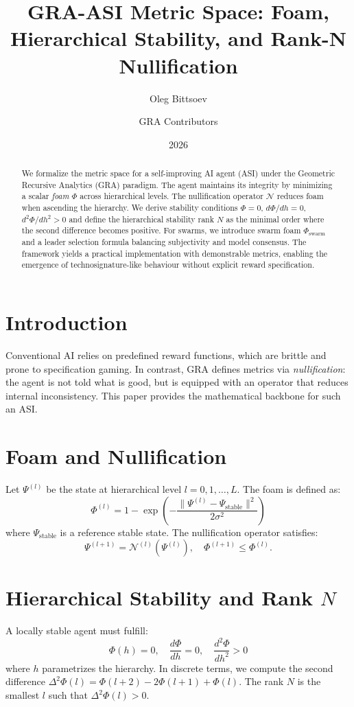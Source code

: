 \documentclass{article}
\title{GRA-ASI Metric Space: Foam, Hierarchical Stability, and Rank-N Nullification}
\author{Oleg Bittsoev \and GRA Contributors}
\date{2026}
\begin{document}
\maketitle

\begin{abstract}
We formalize the metric space for a self-improving AI agent (ASI) under the Geometric Recursive Analytics (GRA) paradigm. The agent maintains its integrity by minimizing a scalar \textit{foam} $\Phi$ across hierarchical levels. The nullification operator $\mathcal{N}$ reduces foam when ascending the hierarchy. We derive stability conditions $\Phi=0$, $d\Phi/dh=0$, $d^2\Phi/dh^2>0$ and define the hierarchical stability rank $N$ as the minimal order where the second difference becomes positive. For swarms, we introduce swarm foam $\Phi_{\text{swarm}}$ and a leader selection formula balancing subjectivity and model consensus. The framework yields a practical implementation with demonstrable metrics, enabling the emergence of technosignature-like behaviour without explicit reward specification.
\end{abstract}

\section{Introduction}
Conventional AI relies on predefined reward functions, which are brittle and prone to specification gaming. In contrast, GRA defines metrics via \textit{nullification}: the agent is not told what is good, but is equipped with an operator that reduces internal inconsistency. This paper provides the mathematical backbone for such an ASI.

\section{Foam and Nullification}
Let $\Psi^{(l)}$ be the state at hierarchical level $l=0,1,\dots,L$. The foam is defined as:
\[
\Phi^{(l)} = 1 - \exp\left(-\frac{\|\Psi^{(l)} - \Psi_{\text{stable}}\|^2}{2\sigma^2}\right)
\]
where $\Psi_{\text{stable}}$ is a reference stable state. The nullification operator satisfies:
\[
\Psi^{(l+1)} = \mathcal{N}^{(l)}(\Psi^{(l)}),\quad \Phi^{(l+1)} \le \Phi^{(l)}.
\]

\section{Hierarchical Stability and Rank $N$}
A locally stable agent must fulfill:
\[
\Phi(h) = 0,\quad \frac{d\Phi}{dh}=0,\quad \frac{d^2\Phi}{dh^2} > 0
\]
where $h$ parametrizes the hierarchy. In discrete terms, we compute the second difference $\Delta^2 \Phi(l) = \Phi(l+2)-2\Phi(l+1)+\Phi(l)$. The rank $N$ is the smallest $l$ such that $\Delta^2 \Phi(l) > 0$.
\end{document}
